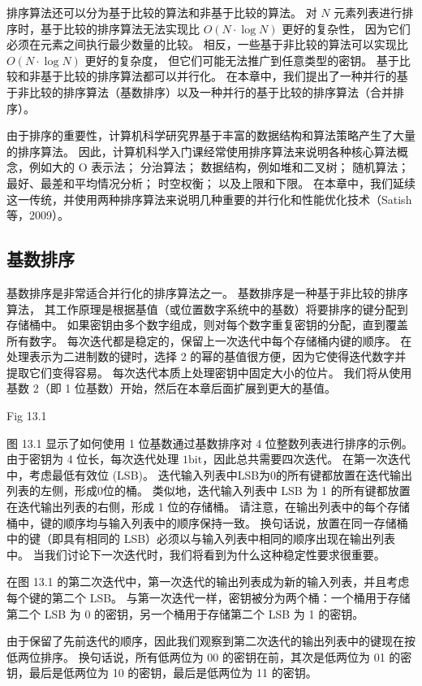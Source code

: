 排序算法还可以分为基于比较的算法和非基于比较的算法。 
对 $N$ 元素列表进行排序时，基于比较的排序算法无法实现比 $O(N \cdot \log N)$ 更好的复杂性，
因为它们必须在元素之间执行最少数量的比较。 相反，一些基于非比较的算法可以实现比 $O(N \cdot \log N)$ 更好的复杂度，
但它们可能无法推广到任意类型的密钥。 基于比较和非基于比较的排序算法都可以并行化。 
在本章中，我们提出了一种并行的基于非比较的排序算法（基数排序）以及一种并行的基于比较的排序算法（合并排序）。

由于排序的重要性，计算机科学研究界基于丰富的数据结构和算法策略产生了大量的排序算法。 
因此，计算机科学入门课经常使用排序算法来说明各种核心算法概念，例如大的 $\mathrm{O}$ 表示法； 
分治算法； 数据结构，例如堆和二叉树； 随机算法； 最好、最差和平均情况分析； 时空权衡； 以及上限和下限。 
在本章中，我们延续这一传统，并使用两种排序算法来说明几种重要的并行化和性能优化技术（Satish 等，2009）。

\subsection{基数排序}
基数排序是非常适合并行化的排序算法之一。 基数排序是一种基于非比较的排序算法，
其工作原理是根据基值（或位置数字系统中的基数）将要排序的键分配到存储桶中。 
如果密钥由多个数字组成，则对每个数字重复密钥的分配，直到覆盖所有数字。 
每次迭代都是稳定的，保留上一次迭代中每个存储桶内键的顺序。 
在处理表示为二进制数的键时，选择 2 的幂的基值很方便，因为它使得迭代数字并提取它们变得容易。 
每次迭代本质上处理密钥中固定大小的位片。 我们将从使用基数 2（即 1 位基数）开始，然后在本章后面扩展到更大的基值。

{\color{red} Fig 13.1}

图 13.1 显示了如何使用 1 位基数通过基数排序对 4 位整数列表进行排序的示例。 
由于密钥为 4 位长，每次迭代处理 $1 \mathrm{bit}$，因此总共需要四次迭代。 在第一次迭代中，考虑最低有效位 (LSB)。 
迭代输入列表中LSB为0的所有键都放置在迭代输出列表的左侧，形成0位的桶。 
类似地，迭代输入列表中 LSB 为 1 的所有键都放置在迭代输出列表的右侧，形成 1 位的存储桶。 
请注意，在输出列表中的每个存储桶中，键的顺序均与输入列表中的顺序保持一致。 
换句话说，放置在同一存储桶中的键（即具有相同的 LSB）必须以与输入列表中相同的顺序出现在输出列表中。 
当我们讨论下一次迭代时，我们将看到为什么这种稳定性要求很重要。

在图 13.1 的第二次迭代中，第一次迭代的输出列表成为新的输入列表，并且考虑每个键的第二个 LSB。 
与第一次迭代一样，密钥被分为两个桶：一个桶用于存储第二个 LSB 为 0 的密钥，另一个桶用于存储第二个 LSB 为 1 的密钥。

由于保留了先前迭代的顺序，因此我们观察到第二次迭代的输出列表中的键现在按低两位排序。 
换句话说，所有低两位为 00 的密钥在前，其次是低两位为 01 的密钥，最后是低两位为 10 的密钥，最后是低两位为 11 的密钥。

